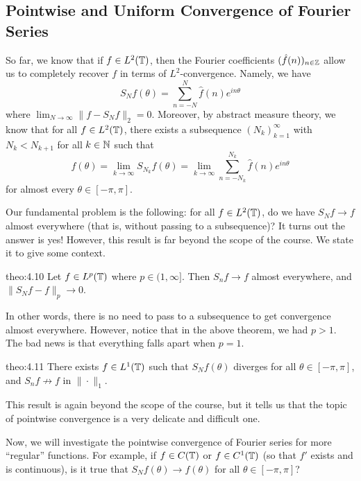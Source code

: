\subsection{Pointwise and Uniform Convergence of Fourier Series} \label{subsec:4.3}
So far, we know that if $f \in L^2(\mathbb{T})$, then the Fourier coefficients 
$(\hat f(n))_{n\in\mathbb{Z}}$ allow us to completely recover $f$ in terms of 
$L^2$-convergence. Namely, we have 
\[ S_Nf(\theta) = \sum_{n=-N}^N \hat f(n) e^{in\theta} \] 
where $\lim_{N\to\infty} \|f - S_Nf\|_2 = 0$. Moreover, by abstract 
measure theory, we know that for all $f \in L^2(\mathbb{T})$, there exists a subsequence 
$(N_k)_{k=1}^\infty$ with $N_k < N_{k+1}$ for all $k \in \mathbb{N}$ such that 
\[ f(\theta) = \lim_{k\to\infty} S_{N_k}f(\theta) = \lim_{k\to\infty} 
\sum_{n=-N_k}^{N_k} \hat f(n) e^{in\theta} \] 
for almost every $\theta \in [-\pi, \pi]$. 

Our fundamental problem is the following: for all $f \in L^2(\mathbb{T})$, do we have 
$S_Nf \to f$ almost everywhere (that is, without passing to a subsequence)? 
It turns out the answer is yes! However, this result is far beyond the 
scope of the course. We state it to give some context. 

\begin{theo}{theo:4.10}
    Let $f \in L^p(\mathbb{T})$ where $p \in (1, \infty]$. Then $S_n f \to f$ 
    almost everywhere, and $\|S_N f - f\|_p \to 0$. 
\end{theo}

In other words, there is no need to pass to a subsequence to get convergence 
almost everywhere. However, notice that in the above theorem, we had $p > 1$. 
The bad news is that everything falls apart when $p = 1$. 

\begin{theo}{theo:4.11}
    There exists $f \in L^1(\mathbb{T})$ such that $S_N f(\theta)$ diverges for 
    all $\theta \in [-\pi, \pi]$, and $S_n f \nrightarrow f$ in $\|\cdot\|_1$. 
\end{theo}

This result is again beyond the scope of the course, but it tells us that 
the topic of pointwise convergence is a very delicate and difficult one. 

Now, we will investigate the pointwise convergence of Fourier series for 
more ``regular'' functions. For example, if $f \in C(\mathbb{T})$ or $f \in C^1(\mathbb{T})$ 
(so that $f'$ exists and is continuous), is it true that $S_N f(\theta) \to 
f(\theta)$ for all $\theta \in [-\pi, \pi]$? 

